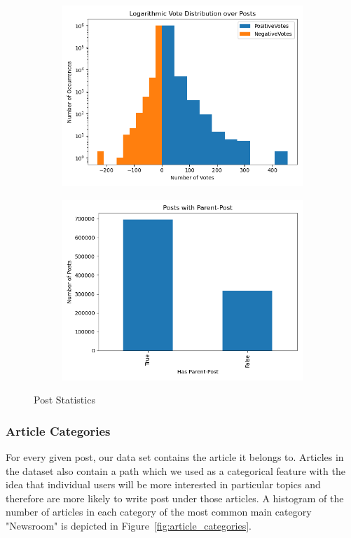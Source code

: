 \documentclass[acmsmall]{acmart}
\begin{document}
\begin{figure}[H]
\centering
\begin{subfigure}{.5\textwidth}
\centering
  \includegraphics[width=.9\linewidth]{assets/Logarithmic_Vote_Distribution_over_Posts.png}
 \end{subfigure}%
\begin{subfigure}{.5\textwidth}
\centering
  \includegraphics[width=.9\linewidth]{assets/Posts_with_parent_post.png}
 \end{subfigure}
 \caption{Post Statistics}
\label{fig:post_stats}
\end{figure}

\subsubsection{Article Categories}
For every given post, our data set contains the article it belongs to. Articles in the dataset also contain a path which we used as a categorical feature with the idea that individual users will be more interested in particular topics and therefore are more likely to write post under those articles. A histogram of the number of articles in each category of the most common main category "Newsroom" is depicted in Figure~\ref{fig:article_categories}.
\end{document}
